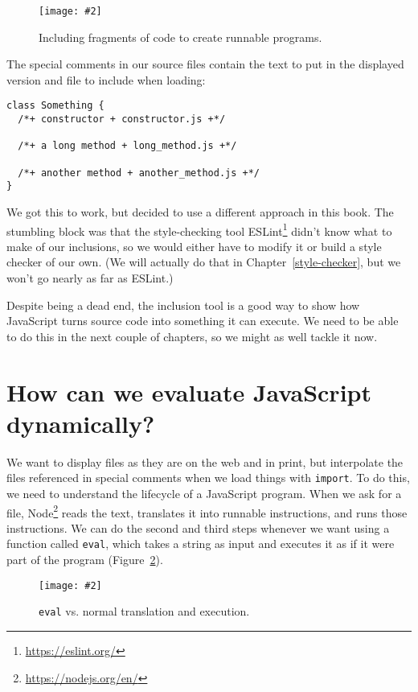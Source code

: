 \documentclass[krantzl]{krantz}
\newcommand{\figpdf}[4]{\begin{figure}%
\centering%
\texttt{[image: \#2]}%
\caption{#3}%
\label{#1}%
\end{figure}}
\newcommand{\chapref}[1]{Chapter~\ref{#1}}
\newcommand{\figref}[1]{Figure~\ref{#1}}
\newcommand{\hreffoot}[2]{{#1}\footnote{\href{#2}{#2}}}
\begin{document}
\figpdf{file-interpolator-conceptual}{./file-interpolator/conceptual.pdf}{Including fragments of code to create runnable programs.}{0.6}


The special comments in our source files contain
the text to put in the displayed version
and file to include when loading:


\begin{lstlisting}[frame=tblr]
class Something {
  /*+ constructor + constructor.js +*/

  /*+ a long method + long_method.js +*/

  /*+ another method + another_method.js +*/
}
\end{lstlisting}



We got this to work,
but decided to use a different approach in this book.
The stumbling block was that the style-checking tool \hreffoot{ESLint}{https://eslint.org/}
didn’t know what to make of our inclusions,
so we would either have to modify it or build a style checker of our own.
(We will actually do that in \chapref{style-checker},
but we won’t go nearly as far as ESLint.)


Despite being a dead end,
the inclusion tool is a good way to show
how JavaScript turns source code into something it can execute.
We need to be able to do this in the next couple of chapters,
so we might as well tackle it now.

\section{How can we evaluate JavaScript dynamically?}\label{file-interpolator-dynamic}


We want to display files as they are on the web and in print,
but interpolate the files referenced in special comments
when we load things with \texttt{import}.
To do this,
we need to understand the lifecycle of a JavaScript program.
When we ask for a file,
\hreffoot{Node}{https://nodejs.org/en/} reads the text,
translates it into runnable instructions,
and runs those instructions.
We can do the second and third steps whenever we want using a function called \texttt{eval},
which takes a string as input and executes it as if it were part of the program
(\figref{file-interpolator-eval}).

\figpdf{file-interpolator-eval}{./file-interpolator/eval.pdf}{\texttt{eval} vs. normal translation and execution.}{0.6}
\end{document}
